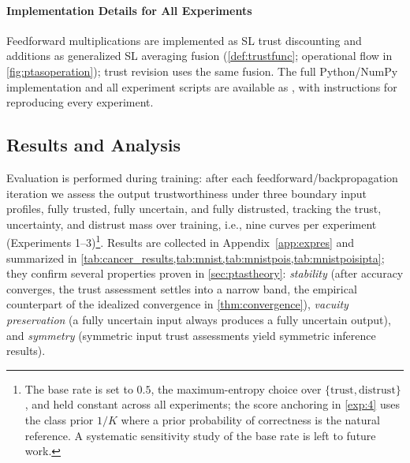 \paragraph*{Implementation Details for All Experiments}
Feedforward multiplications are implemented as SL trust discounting and additions as generalized SL averaging fusion (\cref{def:trustfunc}; operational flow in \cref{fig:ptasoperation}); trust revision uses the same fusion. The full Python/NumPy implementation and all experiment scripts are available as \suppp, with instructions for reproducing every experiment.

\vspace{-0.5em}
\subsection{Results and Analysis}
Evaluation is performed during training: after each feedforward/backpropagation iteration we assess the output trustworthiness under three boundary input profiles, fully trusted, fully uncertain, and fully distrusted, tracking the trust, uncertainty, and distrust mass over training, i.e., nine curves per experiment (Experiments 1--3)\footnote{The base rate is set to $0.5$, the maximum-entropy choice over $\{\text{trust}, \text{distrust}\}$, and held constant across all experiments; the score anchoring in \cref{exp:4} uses the class prior $1/K$ where a prior probability of correctness is the natural reference. A systematic sensitivity study of the base rate is left to future work.}. Results are collected in Appendix~\ref{app:expres} and summarized in \cref{tab:cancer_results,tab:mnist,tab:mnistpois,tab:mnistpoisipta}; they confirm several properties proven in \cref{sec:ptastheory}: \emph{stability} (after accuracy converges, the trust assessment settles into a narrow band, the empirical counterpart of the idealized convergence in \cref{thm:convergence}), \emph{vacuity preservation} (a fully uncertain input always produces a fully uncertain output), and \emph{symmetry} (symmetric input trust assessments yield symmetric inference results).

